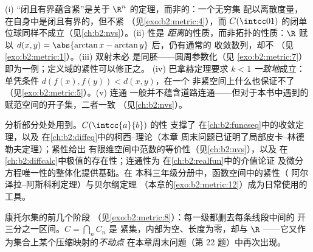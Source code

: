 \begin{remark}[常见误区]\label{rem:b2:metric:pitfalls}
(i) “闭且有界蕴含紧”是关于
$\R^n$ 的定理，而非的：一个无穷集
配以离散度量，在自身中是闭且有界的，但不紧
（见\cref{exo:b2:metric:4}），而
$C(\intcc01)$ 的闭单位球同样不成立（见\cref{ch:b2:nvs}）。(ii) 性是
\emph{距离}的性质，而非拓扑的性质：$\R$
赋以 $d(x,y) = \abs{\arctan x - \arctan y}$ 后，仍有通常的
收敛数列，却不
（见\cref{exo:b2:metric:1}）。(iii) 双射未必
是同胚——圆周参数化（见
\cref{exo:b2:metric:7}）即为一例；定义域的紧性可以修正之。
(iv) 巴拿赫定理要求 $k < 1$ \emph{一致地}成立：
单凭条件 $d(f(x), f(y)) < d(x,y)$，在一个
非紧空间上什么也保证不了（见\cref{exo:b2:metric:5}）。(v) 连通
一般并不蕴含道路连通——但对于本书中遇到的
赋范空间的开子集，二者一致
（见\cref{ch:b2:nvs}）。
\end{remark}

\begin{remark}[本章的应用]
分析部分处处用到。$C(\intcc{a}{b})$ 的性
支撑了
在\cref{ch:b2:funcseq}中的收敛定理，以及
在\cref{ch:b2:diffeq}中的柯西–理论（本章
周末问题已证明了局部皮卡–林德勒夫定理）；紧性给出
有限维空间中范数的等价性（见\cref{ch:b2:nvs}），以及
在\cref{ch:b2:diffcalc}中极值的存在性；连通性为
在\cref{ch:b2:realfun}中的介值论证
及微分方程唯一性的整体化提供基础。在
本科三年级分册中，函数空间中的紧性（
阿尔泽拉–阿斯科利定理）与贝尔纲定理
（本章的\cref{exo:b2:metric:12}）成为日常使用的工具。
\end{remark}

\begin{omfigure}

{\small 康托尔集的前几个阶段
（见\cref{exo:b2:metric:8}）：每一级都删去每条线段中间的
开三分之一区间。$C = \bigcap_n C_n$ 是
紧集，内部为空、长度为零，却与
$\R$ ——它又作为集合上某个压缩映射的\emph{不动点}
在本章周末问题（第
22 题）中再次出现。}
\end{omfigure}


